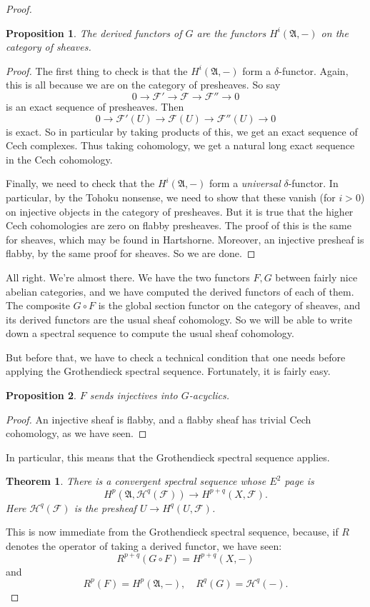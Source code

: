 \documentclass{article}
\newtheorem{theorem}{Theorem}
\newtheorem{proposition}{Proposition}
\begin{document}
\begin{proof}
\begin{proposition} 
The derived functors of $G$ are the functors $H^i(\mathfrak{A}, -)$ on the
category of sheaves.
\end{proposition} 
\begin{proof} 
The first thing to check is that the $H^i(\mathfrak{A}, -)$ form a
$\delta$-functor. Again, this is all because we are on the category of
presheaves. So say 
\[ 0 \to \mathcal{F}' \to \mathcal{F} \to \mathcal{F}'' \to 0 \]
is an exact sequence of presheaves. Then 
\[ 0 \to \mathcal{F'}(U)  \to \mathcal{F}(U) \to \mathcal{F}''(U) \to 0  \]
is exact. So in particular by taking products of this, we get an exact sequence
of Cech complexes. Thus taking cohomology, we get a natural long exact sequence
in the Cech cohomology.

Finally, we need to check that the $H^i(\mathfrak{A}, -)$ form a
\emph{universal} $\delta$-functor. In particular, by the Tohoku nonsense, we
need to show that these vanish (for $i>0$) on injective objects in the category
of presheaves. 
But it is true that the higher Cech cohomologies are zero on flabby presheaves.
The proof of this is the same for sheaves, which may be found in Hartshorne. 
Moreover, an injective presheaf is flabby, by the same proof for sheaves. So we
are done.
\end{proof} 

All right. We're almost there. We have the two functors $F, G $ between fairly
nice abelian categories, and we have computed the derived functors of each of
them. The composite $G \circ F$ is the global section functor on the category
of sheaves, and its derived functors are the usual sheaf cohomology. So we will
be able to write down a spectral sequence to compute the usual sheaf
cohomology. 

But before that, we have to check a technical condition that one
needs before applying the Grothendieck spectral sequence.
Fortunately, it is fairly easy.
\begin{proposition} 
$F$ sends injectives into $G$-acyclics.
\end{proposition} 

\begin{proof} 
An injective sheaf is flabby, and a flabby sheaf has trivial Cech cohomology,
as we have seen.
\end{proof} 

In particular, this means that the Grothendieck spectral sequence applies.

\begin{theorem} 
There is a convergent spectral sequence whose $E^2$ page is
\[ {H}^p(\mathfrak{A}, \mathcal{H}^q(\mathcal{F})) \to H^{p+q}(X,
\mathcal{F}).  \]
Here $\mathcal{H}^q(\mathcal{F})$ is the presheaf $U \to H^q(U, \mathcal{F})$.
\end{theorem} 
This is now immediate from the Grothendieck spectral sequence, because, if $R$
denotes the operator of taking a derived functor, we have seen:
\[ R^{p+q}(G \circ F) = H^{p+q}(X, -)  \]
and
\[ R^p(F) = H^p(\mathfrak{A}, -), \quad R^q(G) = \mathcal{H}^q(-).  \]

\end{proof} 
\end{document}
